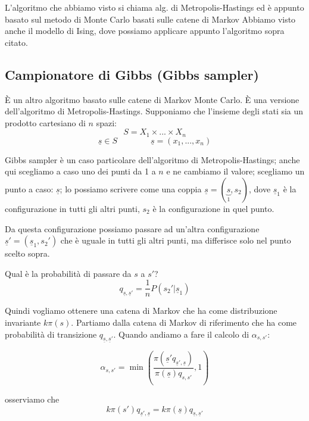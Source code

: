 \documentclass[a4paper,12pt]{book}
\begin{document}

L'algoritmo che abbiamo visto si chiama alg. di Metropolis-Hastings ed è appunto basato sul metodo di Monte Carlo basati sulle catene di Markov
Abbiamo visto anche il modello di Ising, dove possiamo applicare appunto l'algoritmo sopra citato. %

\subsection{Campionatore di Gibbs (Gibbs sampler)}
È un altro algoritmo basato sulle catene di Markov Monte Carlo. È una versione dell'algoritmo di Metropolis-Hastings. Supponiamo che l'insieme degli stati sia un prodotto cartesiano di $ n $ spazi: 
$$ S = X_1 \times ... \times X_n $$
$$ \underline{s} \in S \qquad \qquad \underline{s} = (x_1, ..., x_n) $$

Gibbs sampler è un caso particolare dell'algoritmo di Metropolis-Hastings; anche qui scegliamo a caso uno dei punti da 1 a $ n $ e ne cambiamo il valore; scegliamo un punto a caso: 
$ \underline{s} $; lo possiamo scrivere come una coppia $ \underline{s} = (\underbrace{s}_1, s_2) $, dove $ \underline{s}_1 $ è la configurazione in tutti gli altri punti, $ s_2 $ è la configurazione in quel punto. %

Da questa configurazione possiamo passare ad un'altra configurazione $ \underline{s}' = (\underline{s}_1, s_2') $ che è uguale in tutti gli altri punti, ma differisce solo nel punto scelto sopra. 

Qual è la probabilità di passare da $ s $ a $ s' $?
$$ q_{\underline{s}, \underline{s}'} = \frac{1}{n} P( s_2' | \underline{s}_1 )$$

Quindi vogliamo ottenere una catena di Markov che ha come distribuzione invariante $ k \pi(s) $. Partiamo dalla catena di Markov di riferimento che ha come probabilità di transizione $ q_{\underline{s}, \underline{s}'} $. Quando andiamo a fare il calcolo di $ \alpha_{s,s'} $:

$$ \alpha_{s,s'} = \min\left( \frac{\pi(\underline{s}' q_{\underline{s}', \underline{s}})}{\pi(\underline{s}) q_{s,s'}} , 1   \right) $$ 

osserviamo che 
$$ k\pi(s') q_{\underline{s}', \underline{s}} = k\pi(\underline{s}) q_{\underline{s}, \underline{s}'} $$
\end{document}
